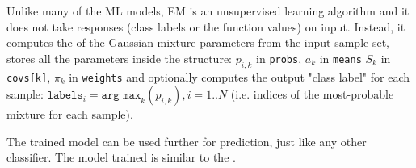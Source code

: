 Unlike many of the ML models, EM is an unsupervised learning algorithm and it does not take responses (class labels or the function values) on input. Instead, it computes the  of the Gaussian mixture parameters from the input sample set, stores all the parameters inside the structure: $p_{i,k}$ in \texttt{probs}, $a_k$ in \texttt{means} $S_k$ in \texttt{covs[k]}, $\pi_k$ in \texttt{weights} and optionally computes the output "class label" for each sample: $\texttt{labels}_i=\texttt{arg max}_k(p_{i,k}), i=1..N$ (i.e. indices of the most-probable mixture for each sample).

The trained model can be used further for prediction, just like any other classifier. The model trained is similar to the .



